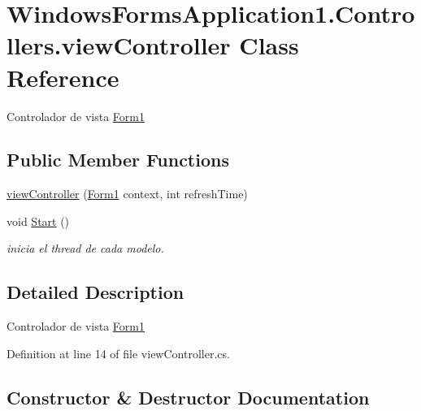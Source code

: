 \hypertarget{class_windows_forms_application1_1_1_controllers_1_1view_controller}{}\section{Windows\+Forms\+Application1.\+Controllers.\+view\+Controller Class Reference}
\label{class_windows_forms_application1_1_1_controllers_1_1view_controller}


Controlador de vista \hyperlink{class_windows_forms_application1_1_1_form1}{Form1}  


\subsection*{Public Member Functions}
\begin{DoxyCompactItemize}
\item 
\hyperlink{class_windows_forms_application1_1_1_controllers_1_1view_controller_a130aae077181af826efe477ab4a8731a}{view\+Controller} (\hyperlink{class_windows_forms_application1_1_1_form1}{Form1} context, int refresh\+Time)
\item 
void \hyperlink{class_windows_forms_application1_1_1_controllers_1_1view_controller_a0cc480fb7958003e130ddb6a4f42650f}{Start} ()
\begin{DoxyCompactList}\small\item\em inicia el thread de cada modelo. \end{DoxyCompactList}\end{DoxyCompactItemize}


\subsection{Detailed Description}
Controlador de vista \hyperlink{class_windows_forms_application1_1_1_form1}{Form1} 



Definition at line 14 of file view\+Controller.\+cs.



\subsection{Constructor \& Destructor Documentation}
\hypertarget{class_windows_forms_application1_1_1_controllers_1_1view_controller_a130aae077181af826efe477ab4a8731a}{}

